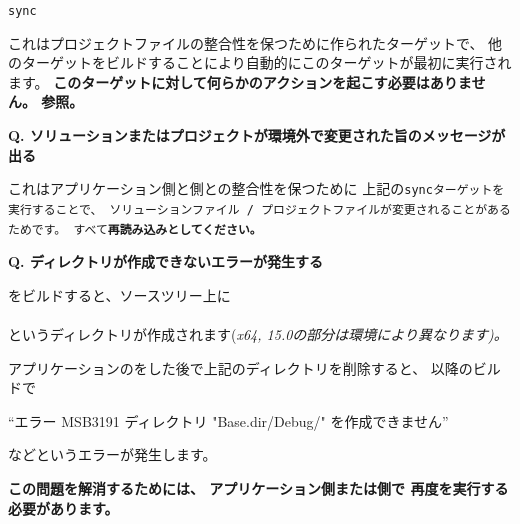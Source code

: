 \tt{sync}
\begin{narrow}
	これはプロジェクトファイルの整合性を保つために作られたターゲットで、
	他のターゲットをビルドすることにより自動的にこのターゲットが最初に実行されます。
	\bf{このターゲットに対して何らかのアクションを起こす必要はありません。}
	 参照。
\end{narrow}

\thinrule{\linewidth}

\bf{Q. ソリューションまたはプロジェクトが環境外で変更された旨のメッセージが出る}

\medskip
これはアプリケーション側と\SprLib 側との整合性を保つために
上記の\tt{sync}ターゲットを実行することで、
ソリューションファイル / プロジェクトファイルが変更されることがあるためです。
すべて\bf{再読み込み}としてください。


\thinrule{\linewidth}

\bf{Q. ディレクトリが作成できないエラーが発生する}

\medskip
\SprLib をビルドすると、ソースツリー上に \\
\hspace{10pt} \\
というディレクトリが作成されます(\it{x64}, \it{15.0}の部分は環境により異なります)。

アプリケーションの\cmake をした後で上記のディレクトリを削除すると、
以降のビルドで

\hspace{20pt}``エラー MSB3191 ディレクトリ "Base.dir/Debug/" を作成できません''

などというエラーが発生します。

\bf{この問題を解消するためには、
アプリケーション側または\SprLib 側で 再度\cmake を実行する必要があります。}

